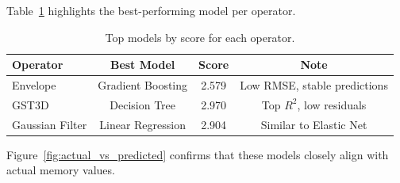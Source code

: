 Table~\ref{tab:performance_summary} highlights the best-performing model per operator.

\begin{table}[htbp]
    \centering
    \begin{tabular}{lccc}
        \hline
        \textbf{Operator} & \textbf{Best Model} & \textbf{Score} & \textbf{Note}                \\
        \hline
        Envelope          & Gradient Boosting   & 2.579          & Low RMSE, stable predictions \\
        \ac{GST3D}        & Decision Tree       & 2.970          & Top $R^2$, low residuals     \\
        Gaussian Filter   & Linear Regression   & 2.904          & Similar to Elastic Net       \\
        \hline
    \end{tabular}
    \caption{Top models by score for each operator.}
    \label{tab:performance_summary}
\end{table}

Figure~\ref{fig:actual_vs_predicted} confirms that these models closely align with actual memory values.

